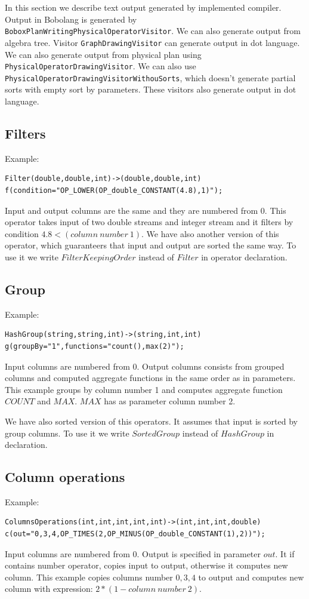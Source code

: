 In this section we describe text output generated by implemented compiler. Output in Bobolang is generated by \texttt{BoboxPlanWritingPhysicalOperatorVisitor}. We can also generate output from algebra tree. Visitor \texttt{GraphDrawingVisitor} can generate output in dot language. We can also generate output from physical plan using \texttt{Physical\-Operator\-Drawing\-Visitor}. We can also use \texttt{Physical\-Operator\-Drawing\-Visitor\-WithouSorts}, which doesn't generate partial sorts with empty sort by parameters. These visitors also generate output in dot language.

\subsection{Filters}
Example: 
\begin{lstlisting}
Filter(double,double,int)->(double,double,int)
f(condition="OP_LOWER(OP_double_CONSTANT(4.8),1)"); 
\end{lstlisting}

Input and output columns are the same and they are numbered from 0.
This operator takes input of two double streams and integer stream and it filters by condition $4.8<(column~number~1)$. We have also another version of this operator, which guaranteers that input and output are sorted the same way. To use it we write $FilterKeepingOrder$ instead of $Filter$ in operator declaration. 

\subsection{Group}
Example: 
\begin{lstlisting}
HashGroup(string,string,int)->(string,int,int)
g(groupBy="1",functions="count(),max(2)");
\end{lstlisting}
Input columns are numbered from 0. Output columns consists from grouped columns and computed aggregate functions in the same order as in parameters. 
This example groups by column number 1 and computes aggregate function $COUNT$ and $MAX$. $MAX$ has as parameter column number 2. 

We have also sorted version of this operators. It assumes that input is sorted by group columns. To use it we write $SortedGroup$ instead of $HashGroup$ in declaration.

\subsection{Column operations}
Example: 
\begin{lstlisting} 
ColumnsOperations(int,int,int,int,int)->(int,int,int,double)
c(out="0,3,4,OP_TIMES(2,OP_MINUS(OP_double_CONSTANT(1),2))"); 
\end{lstlisting}
Input columns are numbered from 0. Output is specified in parameter $out$. It if contains number operator, copies input to output, otherwise it computes new column. 
This example copies columns number $0,3,4$ to output and computes new column with expression: $2*(1-column~number~2)$.

